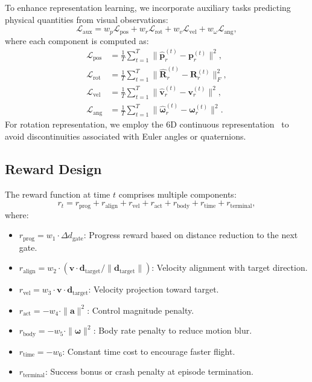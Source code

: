 To enhance representation learning, we incorporate auxiliary tasks predicting physical quantities from visual observations:
\begin{equation}
\mathcal{L}_{\text{aux}} = w_p \mathcal{L}_{\text{pos}} + w_r \mathcal{L}_{\text{rot}} + w_v \mathcal{L}_{\text{vel}} + w_{\omega} \mathcal{L}_{\text{ang}},
\label{eq:aux_loss}
\end{equation}
where each component is computed as:
\begin{align}
\mathcal{L}_{\text{pos}} &= \frac{1}{T} \sum_{t=1}^T \| \hat{\mathbf{p}}_r^{(t)} - \mathbf{p}_r^{(t)} \|^2, \\
\mathcal{L}_{\text{rot}} &= \frac{1}{T} \sum_{t=1}^T \| \hat{\mathbf{R}}_r^{(t)} - \mathbf{R}_r^{(t)} \|_F^2, \\
\mathcal{L}_{\text{vel}} &= \frac{1}{T} \sum_{t=1}^T \| \hat{\mathbf{v}}_r^{(t)} - \mathbf{v}_r^{(t)} \|^2, \\
\mathcal{L}_{\text{ang}} &= \frac{1}{T} \sum_{t=1}^T \| \hat{\boldsymbol{\omega}}_r^{(t)} - \boldsymbol{\omega}_r^{(t)} \|^2.
\end{align}
For rotation representation, we employ the 6D continuous representation~\cite{zhou2019continuity} to avoid discontinuities associated with Euler angles or quaternions.

\subsection{Reward Design}

The reward function at time $t$ comprises multiple components:
\begin{equation}
r_t = r_{\text{prog}} + r_{\text{align}} + r_{\text{vel}} + r_{\text{act}} + r_{\text{body}} + r_{\text{time}} + r_{\text{terminal}},
\label{eq:reward}
\end{equation}
where:
\begin{itemize}
    \item $r_{\text{prog}} = w_1 \cdot \Delta d_{\text{gate}}$: Progress reward based on distance reduction to the next gate.
    \item $r_{\text{align}} = w_2 \cdot (\mathbf{v} \cdot \mathbf{d}_{\text{target}} / \|\mathbf{d}_{\text{target}}\|)$: Velocity alignment with target direction.
    \item $r_{\text{vel}} = w_3 \cdot \mathbf{v} \cdot \mathbf{d}_{\text{target}}$: Velocity projection toward target.
    \item $r_{\text{act}} = -w_4 \cdot \|\mathbf{a}\|^2$: Control magnitude penalty.
    \item $r_{\text{body}} = -w_5 \cdot \|\boldsymbol{\omega}\|^2$: Body rate penalty to reduce motion blur.
    \item $r_{\text{time}} = -w_6$: Constant time cost to encourage faster flight.
    \item $r_{\text{terminal}}$: Success bonus or crash penalty at episode termination.
\end{itemize}


